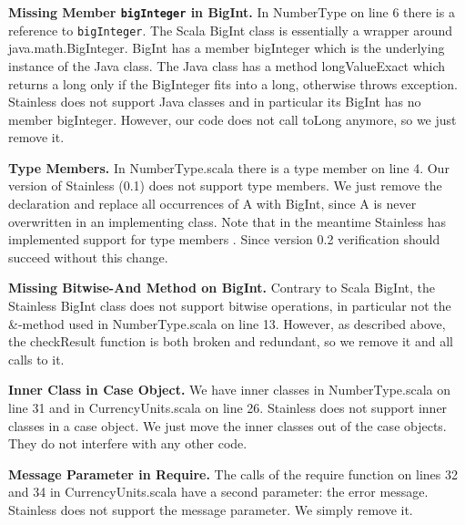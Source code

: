 \documentclass[runningheads]{llncs}
\renewcommand{\paragraph}{\textbf}%
\begin{document}
\paragraph{Missing Member \texttt{bigInteger} in BigInt.} In
NumberType on line 6 there is a reference to \texttt{bigInteger}. The
Scala BigInt class is essentially a wrapper around
java.math.BigInteger. BigInt has a member bigInteger which is the
underlying instance of the Java class. The Java class has a method
longValueExact which returns a long only if the BigInteger fits into a
long, otherwise throws exception. Stainless does not support Java
classes and in particular its BigInt has no member
bigInteger. However, our code does not call toLong anymore, so we just
remove it.

\paragraph{Type Members.} In NumberType.scala there is a type member
on line 4. Our version of Stainless (0.1) does not support type
members. We just remove the declaration and replace all occurrences of
A with BigInt, since A is never overwritten in an implementing class.
Note that in the meantime Stainless has implemented support for type
members \cite{Stainless:pull470}. Since version 0.2 verification
should succeed without this change.


\paragraph{Missing Bitwise-And Method on BigInt.} Contrary to Scala
BigInt, the Stainless BigInt class does not support bitwise
operations, in particular not the \&-method used in NumberType.scala
on line 13. However, as described above, the checkResult function is
both broken and redundant, so we remove it and all calls to it.

\paragraph{Inner Class in Case Object.} We have inner classes in
NumberType.scala on line 31 and in CurrencyUnits.scala on line
26. Stainless does not support inner classes in a case object. We just
move the inner classes out of the case objects. They do not interfere
with any other code.

\paragraph{Message Parameter in Require.} The calls of the require
function on lines 32 and 34 in CurrencyUnits.scala have a second
parameter: the error message. Stainless does not support the message
parameter. We simply remove it.
\end{document}
